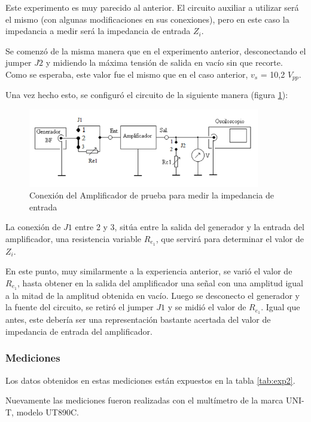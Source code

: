 
Este experimento es muy parecido al anterior. El circuito auxiliar a utilizar será el mismo (con algunas modificaciones en sus conexiones), pero en este caso la impedancia a medir será la impedancia de entrada $Z_i$. 

Se comenzó de la misma manera que en el experimento anterior, desconectando el jumper $J2$ y midiendo la máxima tensión de salida en vacío sin que recorte. Como se esperaba, este valor fue el mismo que en el caso anterior, $v_s$ = 10,2 $V_{pp}$.

Una vez hecho esto, se configuró el circuito de la siguiente manera (figura \ref{fig:circ2}):

\begin{figure}[H]
    \centering
    \includegraphics[width=0.9\textwidth]{Imagenes/conexZiLA.png}
    \caption{Conexión del Amplificador de prueba para medir la impedancia de entrada}
    \label{fig:circ2}
\end{figure}

La conexión de $J1$ entre 2 y 3, sitúa entre la salida del generador y la entrada del amplificador, una resistencia variable $R_{e_1}$, que servirá para determinar el valor de $Z_i$. 

En este punto, muy similarmente a la experiencia anterior, se varió el valor de $R_{e_1}$, hasta obtener en la salida del amplificador una señal con una amplitud igual a la mitad de la amplitud obtenida en vacío. Luego se desconecto el generador y la fuente del circuito, se retiró el jumper $J1$ y se midió el valor de $R_{e_1}$. Igual que antes, este debería ser una representación bastante acertada del valor de impedancia de entrada del amplificador. 

\subsubsection{Mediciones}

Los datos obtenidos en estas mediciones están expuestos en la tabla \ref{tab:exp2}.

Nuevamente las mediciones fueron realizadas con el multímetro de la marca UNI-T, modelo UT890C.

